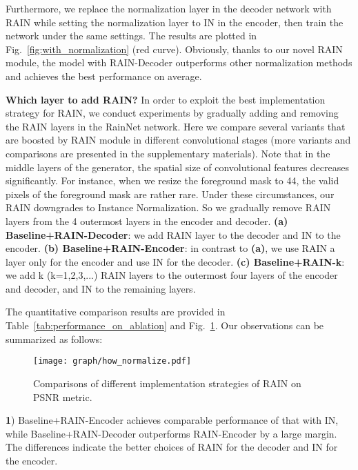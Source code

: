 \documentclass[final]{cvpr}
\begin{document}
Furthermore, we replace the normalization layer in the decoder network with RAIN while setting the normalization layer to IN in the encoder, then train the network under the same settings. The results are plotted in Fig.~\ref{fig:with_normalization} (red curve). Obviously, thanks to our novel RAIN module, the model with RAIN-Decoder outperforms other normalization methods and achieves the best performance on average. 



\noindent
\textbf{Which layer to add RAIN?} In order to exploit the best implementation strategy for RAIN, we conduct experiments by gradually adding and removing the RAIN layers in the RainNet network. Here we compare several variants that are boosted by RAIN module in different convolutional stages (more variants and comparisons are presented in the supplementary materials). Note that in the middle layers of the generator, the spatial size of convolutional features decreases significantly. For instance, when we resize the foreground mask to 44, the valid pixels of the foreground mask are rather rare. Under these circumstances, our RAIN downgrades to Instance Normalization. So we gradually remove RAIN layers from the 4 outermost layers in the encoder and decoder. \textbf{(a) Baseline+RAIN-Decoder}: we add RAIN layer to the decoder and IN to the encoder. \textbf{(b) Baseline+RAIN-Encoder}: in contrast to \textbf{(a)}, we use RAIN a layer only for the encoder and use IN for the decoder. \textbf{(c) Baseline+RAIN-k}: we add k (k=1,2,3,...) RAIN layers to the outermost four layers of the encoder and decoder, and IN to the remaining layers. 

The quantitative comparison results are provided in Table~\ref{tab:performance_on_ablation} and Fig.~\ref{fig:how_normalize}. Our observations can be summarized as follows: 

\begin{figure}
\begin{center}
\texttt{[image: graph/how\_normalize.pdf]}
\end{center}
   \caption{Comparisons of different implementation strategies of RAIN on PSNR metric. }
   \label{fig:how_normalize}
\end{figure}

\noindent
\textbf{1}) Baseline+RAIN-Encoder achieves comparable performance of that with IN, while Baseline+RAIN-Decoder outperforms RAIN-Encoder by a large margin. The differences indicate the better choices of RAIN for the decoder and IN for the encoder. 
\end{document}
